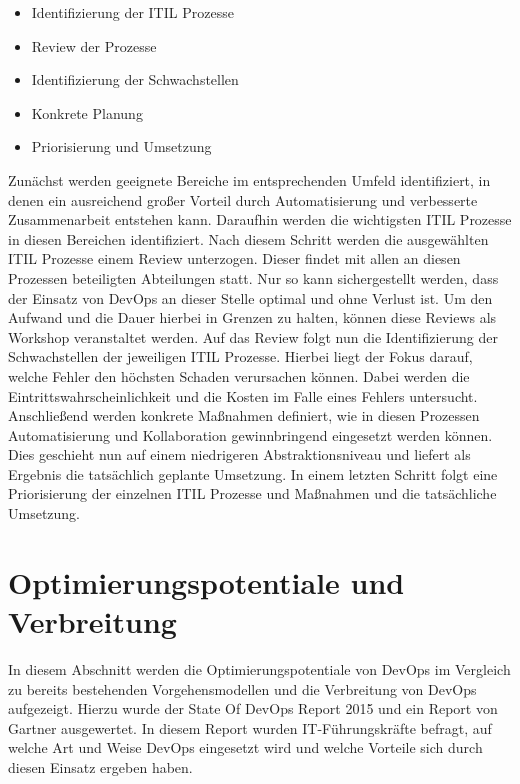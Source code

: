\begin{itemize}
\item Identifizierung der ITIL Prozesse
\item Review der Prozesse
\item Identifizierung der Schwachstellen
\item Konkrete Planung
\item Priorisierung und Umsetzung
\end{itemize}

\parencite[Vgl.][]{Sharp-Paul:2016}

Zunächst werden geeignete Bereiche im entsprechenden Umfeld identifiziert, in denen ein ausreichend großer Vorteil durch Automatisierung und verbesserte Zusammenarbeit entstehen kann. Daraufhin werden die wichtigsten ITIL Prozesse in diesen Bereichen identifiziert. Nach diesem Schritt werden die ausgewählten ITIL Prozesse einem Review unterzogen. Dieser findet mit allen an diesen Prozessen beteiligten Abteilungen statt. Nur so kann sichergestellt werden, dass der Einsatz von DevOps an dieser Stelle optimal und ohne Verlust ist. Um den Aufwand und die Dauer hierbei in Grenzen zu halten, können diese Reviews als Workshop veranstaltet werden. Auf das Review folgt nun die Identifizierung der Schwachstellen der jeweiligen ITIL Prozesse. Hierbei liegt der Fokus darauf, welche Fehler den höchsten Schaden verursachen können. Dabei werden die Eintrittswahrscheinlichkeit und die Kosten im Falle eines Fehlers untersucht. Anschließend werden konkrete Maßnahmen definiert, wie in diesen Prozessen Automatisierung und Kollaboration gewinnbringend eingesetzt werden können. Dies geschieht nun auf einem niedrigeren Abstraktionsniveau und liefert als Ergebnis die tatsächlich geplante Umsetzung. In einem letzten Schritt folgt eine Priorisierung der einzelnen ITIL Prozesse und Maßnahmen und die tatsächliche Umsetzung. \parencite[Vgl.][]{Sharp-Paul:2016}

\newpage
\section{Optimierungspotentiale und Verbreitung} %
In diesem Abschnitt werden die Optimierungspotentiale von DevOps im Vergleich zu bereits bestehenden Vorgehensmodellen und die Verbreitung von DevOps aufgezeigt. Hierzu wurde der \glqq State Of DevOps Report 2015\grqq \parencite[Vgl.][]{DevOpsSODR:2015} und ein Report von Gartner \parencite[Vgl.][]{Gartner:2015} ausgewertet. In diesem Report wurden IT-Führungskräfte befragt, auf welche Art und Weise DevOps eingesetzt wird und welche Vorteile sich durch diesen Einsatz ergeben haben.

